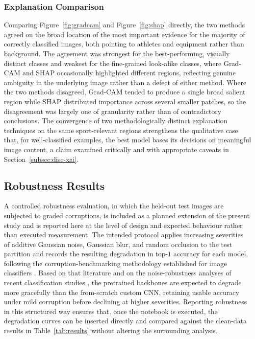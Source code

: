 \subsubsection{Explanation Comparison}
\label{subsubsec:res-xaicompare}

Comparing Figure~\ref{fig:gradcam} and Figure~\ref{fig:shap} directly, the two methods agreed on the broad location of the most important evidence for the majority of correctly classified images, both pointing to athletes and equipment rather than background.
The agreement was strongest for the best-performing, visually distinct classes and weakest for the fine-grained look-alike classes, where Grad-CAM and SHAP occasionally highlighted different regions, reflecting genuine ambiguity in the underlying image rather than a defect of either method.
Where the two methods disagreed, Grad-CAM tended to produce a single broad salient region while SHAP distributed importance across several smaller patches, so the disagreement was largely one of granularity rather than of contradictory conclusions.
The convergence of two methodologically distinct explanation techniques on the same sport-relevant regions strengthens the qualitative case that, for well-classified examples, the best model bases its decisions on meaningful image content, a claim examined critically and with appropriate caveats in Section~\ref{subsec:disc-xai}.

\subsection{Robustness Results}
\label{subsec:res-robustness}

A controlled robustness evaluation, in which the held-out test images are subjected to graded corruptions, is included as a planned extension of the present study and is reported here at the level of design and expected behaviour rather than executed measurement.
The intended protocol applies increasing severities of additive Gaussian noise, Gaussian blur, and random occlusion to the test partition and records the resulting degradation in top-$1$ accuracy for each model, following the corruption-benchmarking methodology established for image classifiers \citep{siedel2023corruption}.
Based on that literature and on the noise-robustness analyses of recent classification studies \citep{ramirezagudelo2026noisy}, the pretrained backbones are expected to degrade more gracefully than the from-scratch custom CNN, retaining usable accuracy under mild corruption before declining at higher severities.
Reporting robustness in this structured way ensures that, once the notebook is executed, the degradation curves can be inserted directly and compared against the clean-data results in Table~\ref{tab:results} without altering the surrounding analysis.

